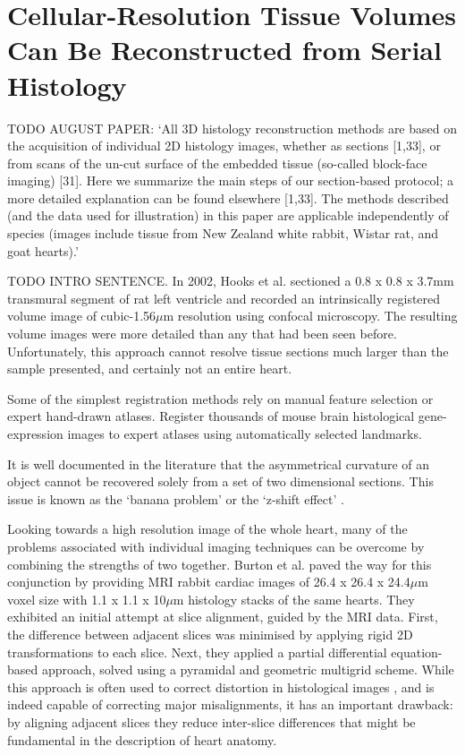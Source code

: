 \section{Cellular-Resolution Tissue Volumes Can Be Reconstructed from Serial Histology} %
  \label{sec:cellular_resolution_tissue_volumes_can_be_reconstructed_from_serial_histology}
  TODO AUGUST PAPER: `All 3D histology reconstruction methods are based on the acquisition of individual 2D histology images, whether as sections [1,33], or from scans of the un-cut surface of the embedded tissue (so-called block-face imaging) [31]. Here we summarize the main steps of our section-based protocol; a more detailed explanation can be found elsewhere [1,33]. The methods described (and the data used for illustration) in this paper are applicable independently of species (images include tissue from New Zealand white rabbit, Wistar rat, and goat hearts).'
  
  TODO INTRO SENTENCE. In 2002, Hooks et al. \cite{Hooks2002} sectioned a 0.8 x 0.8 x 3.7mm transmural segment of rat left ventricle and recorded an intrinsically registered volume image of cubic-1.56$\mu$m resolution using confocal microscopy. The resulting volume images were more detailed than any that had been seen before. Unfortunately, this approach cannot resolve tissue sections much larger than the sample presented, and certainly not an entire heart.
  
  Some of the simplest registration methods rely on manual feature selection or expert hand-drawn atlases. \cite{Jagalur2007} Register thousands of mouse brain histological gene-expression images to expert atlases using automatically selected landmarks.
  
  It is well documented in the literature that the asymmetrical curvature of an object cannot be recovered solely from a set of two dimensional sections. This issue is known as the `banana problem' \cite{Malandain2004,Lyon2012} or the `z-shift effect' \cite{Yushkevich2006}.
  
  Looking towards a high resolution image of the whole heart, many of the problems associated with individual imaging techniques can be overcome by combining the strengths of two together. Burton et al. paved the way for this conjunction by providing \cite{Burton2006} MRI rabbit cardiac images of 26.4 x 26.4 x 24.4$\mu$m voxel size with 1.1 x 1.1 x 10$\mu$m histology stacks of the same hearts. They exhibited an initial attempt at slice alignment, guided by the MRI data. First, the difference between adjacent slices was minimised by applying rigid 2D transformations to each slice. Next, they applied a partial differential equation-based approach, solved using a pyramidal and geometric multigrid scheme. While this approach is often used to correct distortion in histological images \cite{Keeling2005}, and is indeed capable of correcting major misalignments, it has an important drawback: by aligning adjacent slices they reduce inter-slice differences that might be fundamental in the description of heart anatomy.
  
